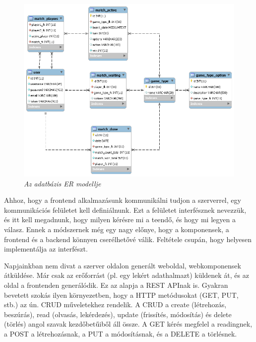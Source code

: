 \begin{figure}[!h]
	\centering
	\includegraphics[width=0.9\linewidth]{kepek/online-games-er.png}
	\caption{\textit{Az adatbázis ER modellje}}
	\label{fig:er-model}
\end{figure}




Ahhoz, hogy a frontend alkalmazásunk kommunikálni tudjon a szerverrel, egy kommunikációs felületet kell definiálnunk. Ezt a felületet interfésznek nevezzük, és itt kell megadnunk, hogy milyen kérésre mi a teendő, és hogy mi legyen a válasz. Ennek a módszernek még egy nagy előnye, hogy a komponensek, a frontend és a backend könnyen cserélhetővé válik. Feltétele csupán, hogy helyesen implementálja az interfészt.

Napjainkban nem divat a szerver oldalon generált weboldal, webkomponensek átküldése. Már csak az erőforrást (pl. egy lekért adathalmazt) küldenek át, és az oldal a frontenden generálódik. Ez az alapja a REST APInak is. Gyakran bevetett szokás ilyen környezetben, hogy a HTTP metódusokat (GET, PUT, stb.) az ún. CRUD műveletekhez rendelik. A CRUD a create (létrehozás, beszúrás), read (olvasás, lekérdezés), update (frissítés, módosítás) és delete (törlés) angol szavak kezdőbetűiből áll össze. A GET kérés megfelel a readingnek, a POST a létrehozásnak, a PUT a módosításnak, és a DELETE a törlésnek.

